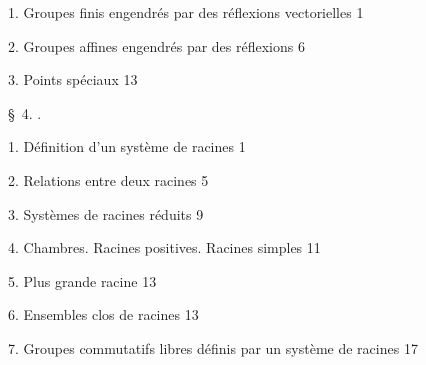 1. Groupes finis engendrés par des réflexions vectorielles \dotfill{} 1

2. Groupes affines engendrés par des réflexions \dotfill{} 6

3. Points spéciaux \dotfill{} 13

\begin{center}\S~4. .\end{center}

1. Définition d’un système de racines \dotfill{} 1

2. Relations entre deux racines \dotfill{} 5

3. Systèmes de racines réduits \dotfill{} 9

4. Chambres. Racines positives. Racines simples \dotfill{} 11

5. Plus grande racine \dotfill{} 13

6. Ensembles clos de racines \dotfill{} 13

7. Groupes commutatifs libres définis par un système de racines \dotfill{} 17
